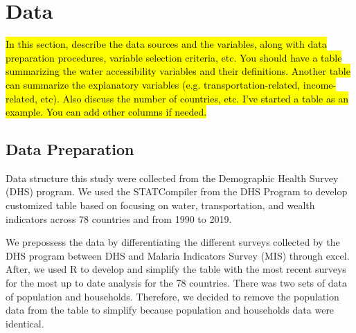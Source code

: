 \documentclass[10pt,twoside]{article}
\numberwithin{equation}{section}
\newcommand{\?}{\stackrel{?}{=}}
\begin{document}
 








 

\eject

\section{Data}
\hl{In this section, describe the data sources and the variables, along with data preparation procedures, variable
  selection criteria, etc. You should have a table summarizing the water accessibility variables and their
  definitions. Another table can summarize the explanatory variables (e.g. transportation-related, income-related,
  etc). Also discuss the number of countries, etc. I've started a table as an example. You can add other columns if needed.}
\subsection{Data Preparation}
Data structure this study were collected from the Demographic Health Survey (DHS) program. We used the STATCompiler from the DHS Program to develop customized table based on focusing on water, transportation, and wealth indicators across 78 countries and from 1990 to 2019.

We prepossess the data by differentiating the different surveys collected by the DHS program between DHS and Malaria Indicators Survey (MIS) through excel. After, we used R to develop and simplify the table with the most recent surveys for the most up to date analysis for the 78 countries. There was two sets of data of population and households. Therefore, we decided to remove the population data from the table to simplify because population and households data were identical. 
\end{document}
